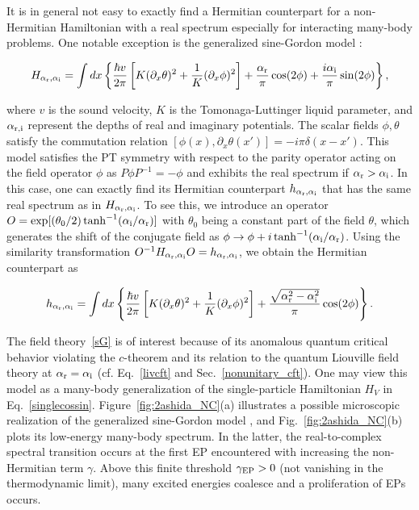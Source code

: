 \documentclass{tADP2e}
\theoremstyle{plain}
\newcommand{\eqn}[1]{
\begin{eqnarray}
	#1
\end{eqnarray}
}
\theoremstyle{plain}
\theoremstyle{definition}
\begin{document}
{It is in general not easy to exactly find a Hermitian counterpart for a non-Hermitian Hamiltonian with a real spectrum especially for interacting many-body problems. One notable exception is the generalized sine-Gordon model \cite{CMB05,YA17nc}:
\eqn{\label{sG}
H_{\alpha_{\rm r},\alpha_{\rm i}}=\int dx\left\{\frac{\hbar v}{2\pi}\left[K(\partial_{x}{\theta})^2+\frac{1}{K}(\partial_{x}{\phi})^2\right]+\frac{\alpha_{\rm r}}{\pi}\cos(2{\phi})+\frac{i \alpha_{\rm i}}{\pi}\sin(2{\phi})\right\},
}
where $v$ is the sound velocity, $K$ is the Tomonaga-Luttinger liquid parameter, and $\alpha_{\rm r,i}$ represent the depths of real and imaginary potentials. The scalar fields $\phi,\theta$ satisfy the commutation relation $[\phi(x),\partial_x\theta(x')]=-i\pi\delta(x-x')$. This model satisfies the PT symmetry with respect to the parity operator acting on the field operator $\phi$ as $P\phi P^{-1}=-\phi$ and exhibits the real spectrum if $\alpha_{\rm r}>\alpha_{\rm i}$. In this case, one can exactly find its Hermitian counterpart $h_{\alpha_{\rm r},\alpha_{\rm i}}$ that has the same real spectrum as in $H_{\alpha_{\rm r},\alpha_{\rm i}}$. To see this, we introduce an operator $O=\exp[(\theta_{0}/2)\tanh^{-1}(\alpha_{\rm i}/\alpha_{\rm r})]$ with $\theta_0$ being a constant part of the field $\theta$, which generates the shift of the conjugate field as $\phi\to\phi+i\tanh^{-1}(\alpha_{\rm i}/\alpha_{\rm r})$.  
Using the similarity transformation $O^{-1}H_{\alpha_{\rm r},\alpha_{\rm i}}O=h_{\alpha_{\rm r},\alpha_{\rm i}}$, we obtain the Hermitian counterpart as
\eqn{
h_{\alpha_{\rm r},\alpha_{\rm i}}=\int dx\left\{\frac{\hbar v}{2\pi}\left[K(\partial_{x}{\theta})^2+\frac{1}{K}(\partial_{x}{\phi})^2\right]+\frac{\sqrt{\alpha_{\rm r}^2-\alpha_{\rm i}^2}}{\pi}\cos(2{\phi})\right\}.
}
The field theory~\eqref{sG} is of interest because of its anomalous quantum critical behavior violating the $c$-theorem \cite{YA17nc} and its relation to the quantum Liouville field theory at $\alpha_{\rm r}=\alpha_{\rm i}$ \cite{IY16,NS90} (cf. Eq.~\eqref{livcft} and Sec.~\ref{nonunitary_cft}).  One may view this model as a many-body generalization of the single-particle Hamiltonian $H_V$ in Eq.~\eqref{singlecossin}. Figure~\ref{fig:2ashida_NC}(a) illustrates a possible microscopic realization of the generalized sine-Gordon model \cite{YA17nc},  and Fig.~\ref{fig:2ashida_NC}(b) plots its low-energy many-body spectrum. In the latter, the real-to-complex spectral transition occurs at the first EP encountered with increasing the non-Hermitian term $\gamma$. Above this finite threshold $\gamma_{\rm EP}>0$ (not vanishing in the thermodynamic limit),  many excited energies coalesce and a proliferation of EPs occurs. 
}
\end{document}

